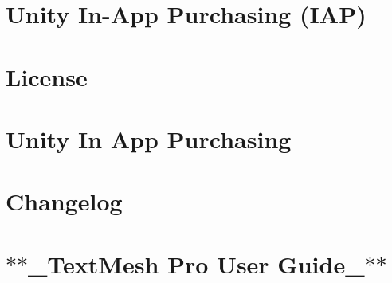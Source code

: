 \let\mypdfximage\pdfximage\def\pdfximage{\immediate\mypdfximage}\documentclass[twoside]{book}
\newcommand{\+}{\discretionary{\mbox{\scriptsize$\hookleftarrow$}}{}{}}
\begin{document}
\chapter{Unity In-\/\+App Purchasing (I\+AP)}
\label{md__o_1__git_h_u_b_m_i_n_i_p_roject__library__package_cache_com_8unity_8purchasing_0D2_80_83__documentation__i_a_p}

\chapter{License}
\label{md__o_1__git_h_u_b_m_i_n_i_p_roject__library__package_cache_com_8unity_8purchasing_0D2_80_83__license}

\chapter{Unity In App Purchasing}
\label{md__o_1__git_h_u_b_m_i_n_i_p_roject__library__package_cache_com_8unity_8purchasing_0D2_80_83__r_e_a_d_m_e}

\chapter{Changelog}
\label{md__o_1__git_h_u_b_m_i_n_i_p_roject__library__package_cache_com_8unity_8textmeshpro_0D1_83_80__c_h_a_n_g_e_l_o_g}

\chapter{$\ast$$\ast$\+\_\+\+Text\+Mesh Pro User Guide\+\_\+$\ast$$\ast$}
\label{md__o_1__git_h_u_b_m_i_n_i_p_roject__library__package_cache_com_8unity_8textmeshpro_0D1_83_80__documentation__text_mesh_pro}

\end{document}
